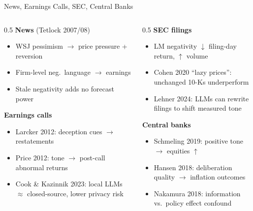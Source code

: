 \documentclass[9pt,t]{beamer}
\begin{document}
\begin{frame}{News, Earnings Calls, SEC, Central Banks}
\begin{columns}[T]
\begin{column}{0.5\textwidth}
\textbf{News} (Tetlock 2007/08)
\begin{itemize}\footnotesize
  \item WSJ pessimism $\to$ price pressure + reversion
  \item Firm-level neg.\ language $\to$ earnings
  \item Stale negativity adds no forecast power
\end{itemize}
\textbf{Earnings calls}
\begin{itemize}\footnotesize
  \item Larcker 2012: deception cues $\to$ restatements
  \item Price 2012: tone $\to$ post-call abnormal returns
  \item Cook \& Kazinnik 2023: local LLMs $\approx$ closed-source, lower privacy risk
\end{itemize}
\end{column}
\begin{column}{0.5\textwidth}
\textbf{SEC filings}
\begin{itemize}\footnotesize
  \item LM negativity $\downarrow$ filing-day return, $\uparrow$ volume
  \item Cohen 2020 ``lazy prices'': unchanged 10-Ks underperform
  \item Lehner 2024: LLMs can rewrite filings to shift measured tone
\end{itemize}
\textbf{Central banks}
\begin{itemize}\footnotesize
  \item Schmeling 2019: positive tone $\to$ equities $\uparrow$
  \item Hansen 2018: deliberation quality $\to$ inflation outcomes
  \item Nakamura 2018: \alert{information vs.\ policy} effect confound
\end{itemize}
\end{column}
\end{columns}
\end{frame}
\end{document}

